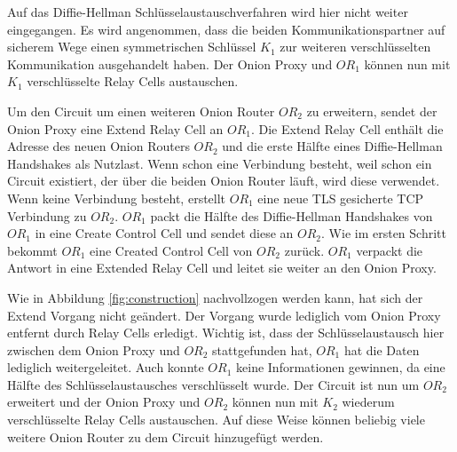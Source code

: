 \documentclass[fleqn,envcountsame,runningheads,10pt,a4paper]{llncs}
\begin{document}
Auf das Diffie-Hellman Schlüsselaustauschverfahren \cite{dh} wird hier nicht weiter eingegangen. Es wird angenommen, dass die beiden Kommunikationspartner auf sicherem Wege einen symmetrischen Schlüssel $K_1$ zur weiteren verschlüsselten Kommunikation ausgehandelt haben. Der Onion Proxy und $\textit{OR}_1$ können nun mit $K_1$ verschlüsselte Relay Cells austauschen. 

\begin{figure}[t]
\end{figure}

Um den Circuit um einen weiteren Onion Router $\textit{OR}_2$ zu erweitern, sendet der Onion Proxy eine Extend Relay Cell an $\textit{OR}_1$. Die Extend Relay Cell enthält die Adresse des neuen Onion Routers $\textit{OR}_2$ und die erste Hälfte eines Diffie-Hellman Handshakes als Nutzlast. Wenn schon eine Verbindung besteht, weil schon ein Circuit existiert, der über die beiden Onion Router läuft, wird diese verwendet. Wenn keine Verbindung besteht, erstellt $\textit{OR}_1$ eine neue TLS\cite{rfc:tls} gesicherte TCP Verbindung zu $\textit{OR}_2$. $\textit{OR}_1$ packt die Hälfte des Diffie-Hellman Handshakes von $\textit{OR}_1$ in eine Create Control Cell und sendet diese an $\textit{OR}_2$. Wie im ersten Schritt bekommt $\textit{OR}_1$ eine Created Control Cell von $\textit{OR}_2$ zurück. $\textit{OR}_1$ verpackt die Antwort in eine Extended Relay Cell und leitet sie weiter an den Onion Proxy.

Wie in Abbildung \ref{fig:construction} nachvollzogen werden kann, hat sich der Extend Vorgang nicht geändert. Der Vorgang wurde lediglich vom Onion Proxy entfernt durch Relay Cells erledigt. Wichtig ist, dass der Schlüsselaustausch hier zwischen dem Onion Proxy und $\textit{OR}_2$ stattgefunden hat, $\textit{OR}_1$ hat die Daten lediglich weitergeleitet. Auch konnte $\textit{OR}_1$ keine Informationen gewinnen, da eine Hälfte des Schlüsselaustausches verschlüsselt wurde. Der Circuit ist nun um $\textit{OR}_2$ erweitert und der Onion Proxy und $\textit{OR}_2$ können nun mit $K_2$ wiederum verschlüsselte Relay Cells austauschen. Auf diese Weise können beliebig viele weitere Onion Router zu dem Circuit hinzugefügt werden.
\end{document}
